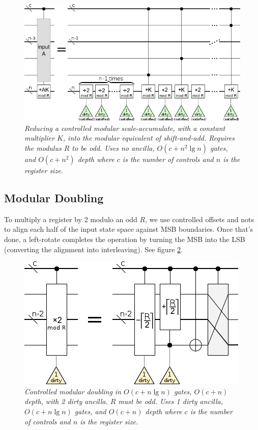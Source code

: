 \documentclass[twocolumn]{article}
\begin{document}
\begin{figure}
  \centering
  \includegraphics[width=\linewidth]{assets/controlled-modular-multiply-accumulate.png}
  \caption{\em
    Reducing a controlled modular scale-accumulate, with a constant multiplier $K$, into the modular equivalent of shift-and-add.
    Requires the modulus $R$ to be odd.
    Uses no ancilla, $O(c + n^2 \lg n)$ gates, and $O(c + n^2)$ depth where $c$ is the number of controls and $n$ is the register size.
  }
  \label{fig:controlled-modular-scale-accumulate}
\end{figure}


\subsection{Modular Doubling}

To multiply a register by 2 modulo an odd $R$, we use controlled offsets and nots to align each half of the input state space against MSB boundaries.
Once that's done, a left-rotate completes the operation by turning the MSB into the LSB (converting the alignment into interleaving).
See figure \ref{fig:modular-double}.

\begin{figure}
  \centering
  \includegraphics[width=\linewidth]{assets/controlled-modular-double.png}
  \caption{\em
    Controlled modular doubling in $O(c + n \lg n)$ gates, $O(c + n)$ depth, with 2 dirty ancilla.
    $R$ must be odd.
    Uses 1 dirty ancilla, $O(c + n \lg n)$ gates, and $O(c + n)$ depth where $c$ is the number of controls and $n$ is the register size.
  }
  \label{fig:modular-double}
\end{figure}
\end{document}
